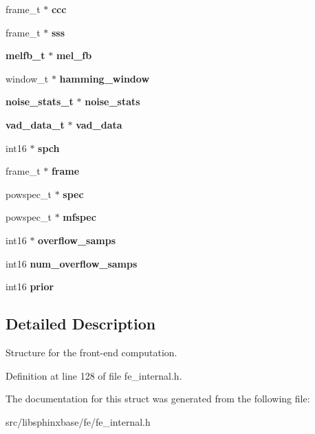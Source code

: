 \begin{DoxyCompactItemize}
\item 
frame\+\_\+t $\ast$ {\bfseries ccc}\label{structfe__s_afc472de43bd747de659dd57bc9a74fae}

\item 
frame\+\_\+t $\ast$ {\bfseries sss}\label{structfe__s_a6525c59397073d363e1844c28746fcb9}

\item 
{\bf melfb\+\_\+t} $\ast$ {\bfseries mel\+\_\+fb}\label{structfe__s_ae5a054dbac5e32cf028b6d6d4c9391bd}

\item 
window\+\_\+t $\ast$ {\bfseries hamming\+\_\+window}\label{structfe__s_ad47433337a370e452070ffddce87e474}

\item 
{\bf noise\+\_\+stats\+\_\+t} $\ast$ {\bfseries noise\+\_\+stats}\label{structfe__s_a6b1303b8c74a676ca9dcc9adc07033e9}

\item 
{\bf vad\+\_\+data\+\_\+t} $\ast$ {\bfseries vad\+\_\+data}\label{structfe__s_aaae66e5327a74c4270c8f0decd4d4389}

\item 
int16 $\ast$ {\bfseries spch}\label{structfe__s_a7d49693c1fa1b14bbcd25b87ad97935b}

\item 
frame\+\_\+t $\ast$ {\bfseries frame}\label{structfe__s_a6fe89784eb5d23ee812439f427d33fe6}

\item 
powspec\+\_\+t $\ast$ {\bfseries spec}\label{structfe__s_af455b0ee3f8d81ca84ac88d4ea04e860}

\item 
powspec\+\_\+t $\ast$ {\bfseries mfspec}\label{structfe__s_a87fd448109884fc3d796b926b67697e7}

\item 
int16 $\ast$ {\bfseries overflow\+\_\+samps}\label{structfe__s_a7975216c6a540fa498352736404797b1}

\item 
int16 {\bfseries num\+\_\+overflow\+\_\+samps}\label{structfe__s_ac22fe7c117ef00eb513d7d0771333ddd}

\item 
int16 {\bfseries prior}\label{structfe__s_ae6af635a19dac6426bf882a3fc5b069b}

\end{DoxyCompactItemize}


\subsection{Detailed Description}
Structure for the front-\/end computation. 



Definition at line 128 of file fe\+\_\+internal.\+h.



The documentation for this struct was generated from the following file\+:\begin{DoxyCompactItemize}
\item 
src/libsphinxbase/fe/fe\+\_\+internal.\+h\end{DoxyCompactItemize}
